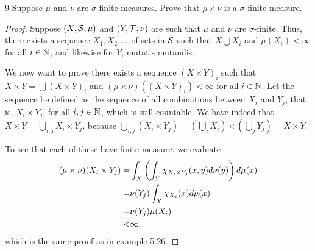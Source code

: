 \begin{exercise}{9}
Suppose $\mu$ and $\nu$ are $\sigma$-finite measures.
Prove that $\mu \times \nu$ is a $\sigma$-finite measure.
\end{exercise}
\begin{proof}
Suppose $(X, \mathcal{S}, \mu)$ and $(Y, \mathcal{T}, \nu)$ are such that $\mu$ and $\nu$ are $\sigma$-finite.
Thus, there exists a sequence $X_1, X_2, \dots$ of sets in $\mathcal{S}$ such that $X \bigcup X_i$ and $\mu(X_i) < \infty$ for all $i \in \mathbb{N}$, and likewise for $Y$, mutatis mutandis.

We now want to prove there exists a sequence $(X \times Y)_i$ such that $X \times Y = \bigcup (X \times Y)_i$ and $(\mu \times \nu)((X \times Y)_i) < \infty$ for all $i \in \mathbb{N}$.
Let the sequence be defined as the sequence of all combinations between $X_i$ and $Y_j$, that is, $X_i \times Y_j$, for all $i, j \in \mathbb{N}$, which is still countable.
We have indeed that $X \times Y = \bigcup_{i,j} X_i \times Y_j$, because $\bigcup_{i,j} (X_i \times Y_j) = (\bigcup_i X_i) \times (\bigcup_j Y_j) = X \times Y$.

To see that each of these have finite measure, we evaluate 
\begin{align*}
    (\mu \times \nu)(X_i \times Y_j) 
    =& \int_X \left( \int_Y \chi_{X_i \times Y_j}(x,y) d\nu(y)\right) d\mu(x)\\
    =& \nu(Y_j) \int_X  \chi_{X_i}(x) d\mu(x)\\
    =& \nu(Y_j)\mu(X_i)\\
    <& \infty,
\end{align*}
which is the same proof as in example 5.26.
\end{proof} 

